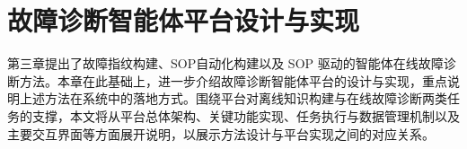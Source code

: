 
\chapter{故障诊断智能体平台设计与实现}

第三章提出了故障指纹构建、SOP自动化构建以及 SOP 驱动的智能体在线故障诊断方法。本章在此基础上，进一步介绍故障诊断智能体平台的设计与实现，重点说明上述方法在系统中的落地方式。围绕平台对离线知识构建与在线故障诊断两类任务的支撑，本文将从平台总体架构、关键功能实现、任务执行与数据管理机制以及主要交互界面等方面展开说明，以展示方法设计与平台实现之间的对应关系。










